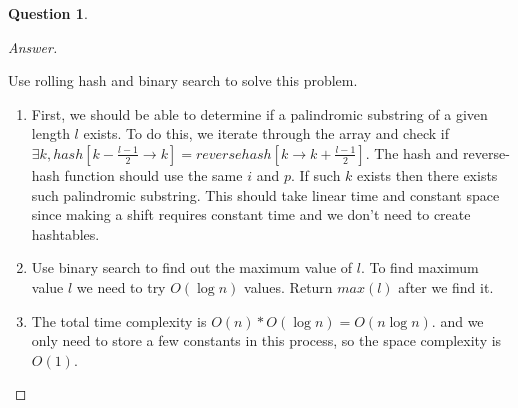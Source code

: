 \documentclass{article}
\theoremstyle{plain}
\newtheorem{question}{Question}
\newenvironment{answer}[1][Answer]
    {\begin{proof}[#1]{$ $}\renewcommand\qedsymbol{$\vartriangle$}}
    {\end{proof}}
\begin{document}
\begin{question}
\end{question}
\begin{answer}
    \begin{enumerate}
        Use rolling hash and binary search to solve this problem.
        \begin{enumerate}
            \item First, we should be able to determine if a palindromic substring of a given length $l$ exists. To do this, we iterate through the array and check if $\exists k, hash[k - \frac{l-1}{2} \rightarrow k] = reversehash[k \rightarrow k + \frac{l-1}{2}]$. The hash and reverse-hash function should use the same $i$ and $p$. If such $k$ exists then there exists such palindromic substring. This should take linear time and constant space since making a shift requires constant time and we don't need to create hashtables.
            \item Use binary search to find out the maximum value of $l$. To find maximum value $l$ we need to try $O(\log n)$ values. Return $max(l)$ after we find it.
            \item The total time complexity is $O(n)* O(\log n) = O(n \log n)$. and we only need to store a few constants in this process, so the space complexity is $O(1)$.
        \end{enumerate}
    \end{enumerate}
\end{answer}
\end{document}
